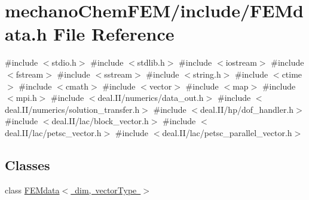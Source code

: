 \section{mechano\+Chem\+F\+E\+M/include/\+F\+E\+Mdata.h File Reference}
\label{_f_e_mdata_8h}
{\ttfamily \#include $<$stdio.\+h$>$}\newline
{\ttfamily \#include $<$stdlib.\+h$>$}\newline
{\ttfamily \#include $<$iostream$>$}\newline
{\ttfamily \#include $<$fstream$>$}\newline
{\ttfamily \#include $<$sstream$>$}\newline
{\ttfamily \#include $<$string.\+h$>$}\newline
{\ttfamily \#include $<$ctime$>$}\newline
{\ttfamily \#include $<$cmath$>$}\newline
{\ttfamily \#include $<$vector$>$}\newline
{\ttfamily \#include $<$map$>$}\newline
{\ttfamily \#include $<$mpi.\+h$>$}\newline
{\ttfamily \#include $<$deal.\+I\+I/numerics/data\+\_\+out.\+h$>$}\newline
{\ttfamily \#include $<$deal.\+I\+I/numerics/solution\+\_\+transfer.\+h$>$}\newline
{\ttfamily \#include $<$deal.\+I\+I/hp/dof\+\_\+handler.\+h$>$}\newline
{\ttfamily \#include $<$deal.\+I\+I/lac/block\+\_\+vector.\+h$>$}\newline
{\ttfamily \#include $<$deal.\+I\+I/lac/petsc\+\_\+vector.\+h$>$}\newline
{\ttfamily \#include $<$deal.\+I\+I/lac/petsc\+\_\+parallel\+\_\+vector.\+h$>$}\newline
\subsection*{Classes}
\begin{DoxyCompactItemize}
\item 
class \mbox{\hyperlink{class_f_e_mdata}{F\+E\+Mdata$<$ dim, vector\+Type $>$}}
\end{DoxyCompactItemize}
